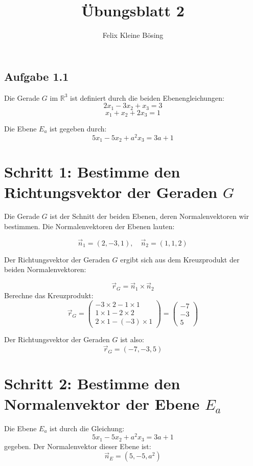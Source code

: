 \documentclass[11pt]{article}
\begin{document}
\title{Übungsblatt 2}
\author{Felix Kleine Bösing}
\maketitle

\subsection{Aufgabe 1.1}
Die Gerade \( G \) im \( \mathbb{R}^3 \) ist definiert durch die beiden Ebenengleichungen:
\[
2x_1 - 3x_2 + x_3 = 3
\]
\[
x_1 + x_2 + 2x_3 = 1
\]

Die Ebene \( E_a \) ist gegeben durch:
\[
5x_1 - 5x_2 + a^2 x_3 = 3a + 1
\]

\section*{Schritt 1: Bestimme den Richtungsvektor der Geraden \( G \)}

Die Gerade \( G \) ist der Schnitt der beiden Ebenen, deren Normalenvektoren wir bestimmen. Die Normalenvektoren der Ebenen lauten:

\[
\vec{n}_1 = (2, -3, 1), \quad \vec{n}_2 = (1, 1, 2)
\]

Der Richtungsvektor der Geraden \( G \) ergibt sich aus dem Kreuzprodukt der beiden Normalenvektoren:

\[
\vec{r}_G = \vec{n}_1 \times \vec{n}_2
\]
Berechne das Kreuzprodukt:
\[
\vec{r}_G = \begin{pmatrix}
-3 \times 2 - 1 \times 1 \\
1 \times 1 - 2 \times 2 \\
2 \times 1 - (-3) \times 1
\end{pmatrix}
=
\begin{pmatrix}
-7 \\
-3 \\
5
\end{pmatrix}
\]

Der Richtungsvektor der Geraden \( G \) ist also:
\[
\vec{r}_G = (-7, -3, 5)
\]

\section*{Schritt 2: Bestimme den Normalenvektor der Ebene \( E_a \)}

Die Ebene \( E_a \) ist durch die Gleichung:
\[
5x_1 - 5x_2 + a^2 x_3 = 3a + 1
\]
gegeben. Der Normalenvektor dieser Ebene ist:
\[
\vec{n}_E = (5, -5, a^2)
\]
\end{document}

